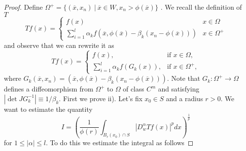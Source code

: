 \documentclass[12pt]{article}
\theoremstyle{definition}
\begin{document}
\begin{proof}
Define $\Omega^+ =\{ (\overline x,x_n) \ |\ \overline x\in W, x_n> \phi(\overline x)  \}$ . We recall the definition of $T$
\[ Tf(x) = \begin{cases}
		f(x) & x \in \Omega \\
		\sum_{i=1}^l \alpha_k f(\overline x, \phi(\overline x)- \beta_k(x_n-\phi(\overline x))) & x \in \Omega^+
\end{cases} 
\]
and observe that we can rewrite it as
\[ Tf(x) = \begin{cases}
		f(x), & \text{if }x \in \Omega, \\
		\sum_{i=1}^l \alpha_k f(G_k(x)), & \text{if } x \in \Omega^+,
\end{cases} 
\]
where $G_k(\overline x, x_n)=(\overline x, \phi(\overline x)- \beta_k(x_n-\phi(\overline x)))$. Note that $G_k: \Omega^+\rightarrow \Omega$ defines a diffeomorphism from $\Omega^+$ to $\Omega$ of class $C^m$ and satisfying $|\det JG_k^{-1}|\equiv 1/\beta_k.$ First we prove ii). Let's fix $x_0 \in S$ and a radius $r>0$. We want to estimate the quantity 
\[ I=\left ( \frac{1}{\phi(r)} \int_{B_r(x_0)\cap S} |D^\alpha_w Tf(x)|^pdx \right)^{\frac{1}{p}}\]
for $1\le|\alpha| \le l$. To do this we estimate the integral as follows


\end{proof}
\end{document}
